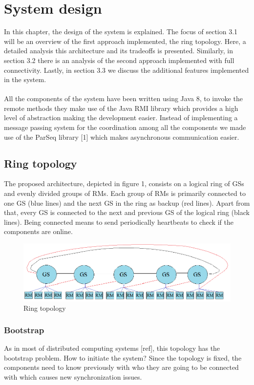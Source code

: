 \section{System design}
In this chapter, the design of the system is explained.
The focus of section 3.1 will be an overview of the first approach implemented, the ring topology. Here, a detailed analysis this architecture and its tradeoffs is presented. Similarly, in section 3.2 there is an analysis of the second approach implemented with full connectivity. Lastly, in section 3.3 we discuss the additional features implemented in the system. \\\\
All the components of the system have been written using Java 8, to invoke the remote methods they make use of the Java RMI library which provides a high level of abstraction making the development easier. Instead of implementing a message passing system for the coordination among all the components we made use of the ParSeq library [1] which makes asynchronous communication easier. 

\subsection{Ring topology}

The proposed architecture, depicted in figure 1, consists on a logical ring of GSs and evenly divided groups of RMs.
Each group of RMs is primarily connected to one GS (blue lines) and the next GS in the ring as backup (red lines). Apart from that, every GS is connected to the next and previous GS of the logical ring (black lines). Being connected means to send periodically heartbeats to check if the components are online. 
\\ 
\begin{figure}[H]
\centering
	\includegraphics[scale=0.62]{ring.png}
	\caption{Ring topology}
\end{figure}

\subsubsection{Bootstrap}
As in most of distributed computing systems [ref], this topology has the bootstrap problem. How to initiate the system? Since the topology is fixed, the components need to know previously with who they are going to be connected with which causes new synchronization issues.

